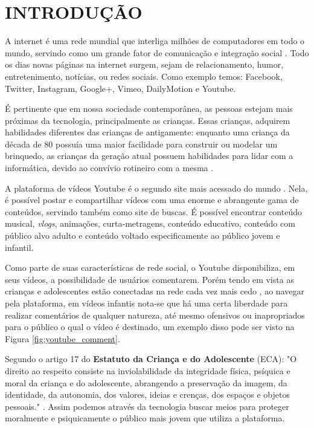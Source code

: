 \section{INTRODUÇÃO}


A internet é uma rede mundial que interliga milhões de computadores em todo o mundo, servindo como um grande fator de comunicação e integração social \cite{marioFalcao2015}. Todo os dias novas páginas na internet surgem, sejam de relacionamento, humor, entretenimento, notícias, ou redes sociais. Como exemplo temos: Facebook, Twitter, Instagram, Google+, Vimeo, DailyMotion e Youtube.

É pertinente que em nossa sociedade contemporânea, as pessoas estejam mais próximas da tecnologia, principalmente as crianças. 
Essas crianças, adquirem habilidades diferentes das crianças de antigamente: enquanto uma criança da década de 80 possuía uma maior facilidade para construir ou modelar um brinquedo, as crianças da geração atual possuem habilidades para lidar com a informática, devido ao convívio rotineiro com a mesma \cite{marioFalcao2016}.

A plataforma de vídeos Youtube é o segundo site mais acessado do mundo \cite{alexaYoutube}. Nela, é possível postar e compartilhar vídeos com uma enorme e abrangente gama de conteúdos, servindo também como site de buscas. É possível encontrar conteúdo musical, \textit{vlogs}, animações, curta-metragens, conteúdo educativo, conteúdo com público alvo adulto e conteúdo voltado especificamente ao público jovem e infantil. 

Como parte de suas características de rede social, o Youtube disponibiliza, em seus vídeos, a possibilidade de usuários comentarem. Porém tendo em vista as crianças e adolescentes estão conectadas na rede cada vez mais cedo \cite{EnyoGoncalves2017}, ao navegar pela plataforma, em vídeos infantis nota-se que há uma certa liberdade para realizar comentários de qualquer natureza, até mesmo ofensivos ou inapropriados para o público o qual o vídeo é destinado, um exemplo disso pode ser visto na Figura \ref{fig:youtube_comment}.

Segundo o artigo 17 do \textbf{Estatuto da Criança e do Adolescente} (ECA): "O direito ao respeito consiste na inviolabilidade da integridade física, psíquica e moral da criança e do adolescente, abrangendo a preservação da imagem, da identidade, da autonomia, dos valores, ideias e crenças, dos espaços e objetos pessoais." \cite{eca_lei}.  Assim podemos através da tecnologia buscar meios para proteger moralmente e psiquicamente o público mais jovem que utiliza a plataforma. %


